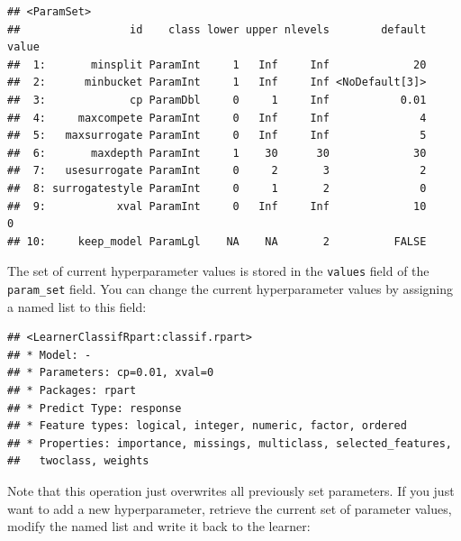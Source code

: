 \documentclass[
]{scrbook}
\newenvironment{Shaded}{\begin{snugshade}}{\end{snugshade}}
\newcommand{\AttributeTok}[1]{\textcolor[rgb]{0.77,0.63,0.00}{#1}}
\newcommand{\DecValTok}[1]{\textcolor[rgb]{0.00,0.00,0.81}{#1}}
\newcommand{\FloatTok}[1]{\textcolor[rgb]{0.00,0.00,0.81}{#1}}
\newcommand{\FunctionTok}[1]{\textcolor[rgb]{0.00,0.00,0.00}{#1}}
\newcommand{\NormalTok}[1]{#1}
\newcommand{\OtherTok}[1]{\textcolor[rgb]{0.56,0.35,0.01}{#1}}
\newcommand{\SpecialCharTok}[1]{\textcolor[rgb]{0.00,0.00,0.00}{#1}}
\renewenvironment{Shaded} {\begin{snugshade}\small} {\end{snugshade}}
\begin{document}
\begin{Shaded}
\end{Shaded}

\begin{verbatim}
## <ParamSet>
##                 id    class lower upper nlevels        default value
##  1:       minsplit ParamInt     1   Inf     Inf             20      
##  2:      minbucket ParamInt     1   Inf     Inf <NoDefault[3]>      
##  3:             cp ParamDbl     0     1     Inf           0.01      
##  4:     maxcompete ParamInt     0   Inf     Inf              4      
##  5:   maxsurrogate ParamInt     0   Inf     Inf              5      
##  6:       maxdepth ParamInt     1    30      30             30      
##  7:   usesurrogate ParamInt     0     2       3              2      
##  8: surrogatestyle ParamInt     0     1       2              0      
##  9:           xval ParamInt     0   Inf     Inf             10     0
## 10:     keep_model ParamLgl    NA    NA       2          FALSE
\end{verbatim}

The set of current hyperparameter values is stored in the \texttt{values} field of the \texttt{param\_set} field.
You can change the current hyperparameter values by assigning a named list to this field:

\begin{Shaded}
\end{Shaded}

\begin{verbatim}
## <LearnerClassifRpart:classif.rpart>
## * Model: -
## * Parameters: cp=0.01, xval=0
## * Packages: rpart
## * Predict Type: response
## * Feature types: logical, integer, numeric, factor, ordered
## * Properties: importance, missings, multiclass, selected_features,
##   twoclass, weights
\end{verbatim}

Note that this operation just overwrites all previously set parameters.
If you just want to add a new hyperparameter, retrieve the current set of parameter values, modify the named list and write it back to the learner:
\end{document}

